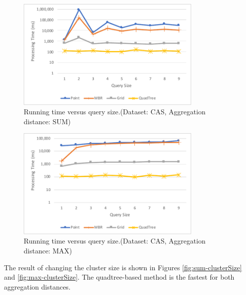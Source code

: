 \documentclass[a4paper,11pt]{report}
\theoremstyle{mytheoremstyle}
\begin{document}
\begin{figure}
    \begin{center}
        \includegraphics[width=0.8\textwidth]{src/images/CAS-SUM-Q.pdf}
    \end{center}
    \caption{Running time versus query size.(Dataset: CAS, Aggregation distance: SUM)}
    \label{fig:sum-querySize-CAS}
\end{figure}

\begin{figure}
    \begin{center}
        \includegraphics[width=0.8\textwidth]{src/images/CAS-MAX-Q.pdf}
    \end{center}
    \caption{Running time versus query size.(Dataset: CAS, Aggregation distance: MAX)}
    \label{fig:max-querySize-CAS}
\end{figure}

The result of changing the cluster size is shown in Figures \ref{fig:sum-clusterSize} and \ref{fig:max-clusterSize}. The quadtree-based method is the fastest for both aggregation distances.
\end{document}
